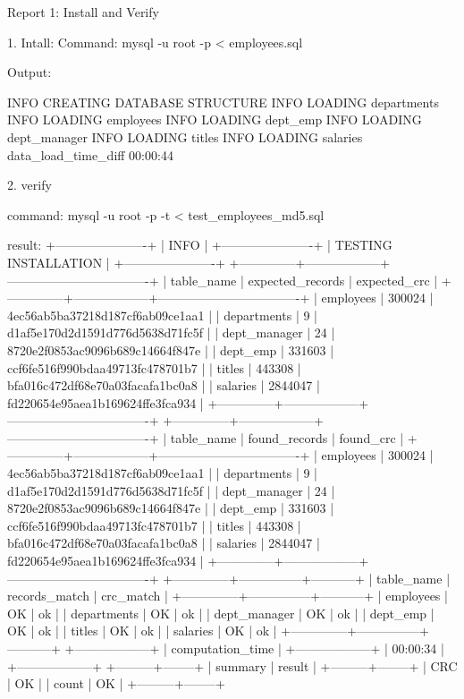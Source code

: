 \documentclass{article}
\begin{document}
\begin{center}
Report 1: Install and Verify
\end{center}

1. Intall: 
Command: mysql -u root -p < employees.sql

Output:

INFO
CREATING DATABASE STRUCTURE
INFO
LOADING departments
INFO
LOADING employees
INFO
LOADING dept_emp
INFO
LOADING dept_manager
INFO
LOADING titles
INFO
LOADING salaries
data_load_time_diff
00:00:44


2. verify

command: mysql -u root -p -t < test_employees_md5.sql

result:
+----------------------+
| INFO                 |
+----------------------+
| TESTING INSTALLATION |
+----------------------+
+--------------+------------------+----------------------------------+
| table_name   | expected_records | expected_crc                     |
+--------------+------------------+----------------------------------+
| employees    |           300024 | 4ec56ab5ba37218d187cf6ab09ce1aa1 |
| departments  |                9 | d1af5e170d2d1591d776d5638d71fc5f |
| dept_manager |               24 | 8720e2f0853ac9096b689c14664f847e |
| dept_emp     |           331603 | ccf6fe516f990bdaa49713fc478701b7 |
| titles       |           443308 | bfa016c472df68e70a03facafa1bc0a8 |
| salaries     |          2844047 | fd220654e95aea1b169624ffe3fca934 |
+--------------+------------------+----------------------------------+
+--------------+------------------+----------------------------------+
| table_name   | found_records    | found_crc                        |
+--------------+------------------+----------------------------------+
| employees    |           300024 | 4ec56ab5ba37218d187cf6ab09ce1aa1 |
| departments  |                9 | d1af5e170d2d1591d776d5638d71fc5f |
| dept_manager |               24 | 8720e2f0853ac9096b689c14664f847e |
| dept_emp     |           331603 | ccf6fe516f990bdaa49713fc478701b7 |
| titles       |           443308 | bfa016c472df68e70a03facafa1bc0a8 |
| salaries     |          2844047 | fd220654e95aea1b169624ffe3fca934 |
+--------------+------------------+----------------------------------+
+--------------+---------------+-----------+
| table_name   | records_match | crc_match |
+--------------+---------------+-----------+
| employees    | OK            | ok        |
| departments  | OK            | ok        |
| dept_manager | OK            | ok        |
| dept_emp     | OK            | ok        |
| titles       | OK            | ok        |
| salaries     | OK            | ok        |
+--------------+---------------+-----------+
+------------------+
| computation_time |
+------------------+
| 00:00:34         |
+------------------+
+---------+--------+
| summary | result |
+---------+--------+
| CRC     | OK     |
| count   | OK     |
+---------+--------+
\end{document}

